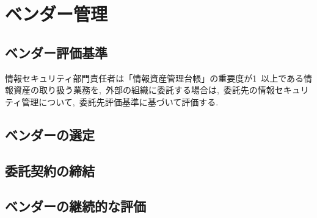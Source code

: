 \chapter{ベンダー管理}
\section{ベンダー評価基準}
情報セキュリティ部門責任者は「情報資産管理台帳」の重要度が1~以上である情報資産の取り扱う業務を,~外部の組織に委託する場合は,~委託先の情報セキュリティ管理について,~委託先評価基準に基づいて評価する.
\section{ベンダーの選定}
\section{委託契約の締結}
\section{ベンダーの継続的な評価}